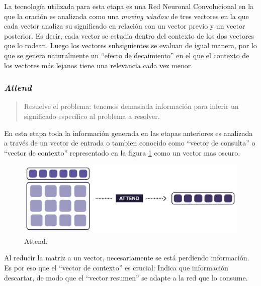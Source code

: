 \documentclass[12pt,a4paper,]{scrartcl}
\begin{document}
La tecnología utilizada para esta etapa es una Red Neuronal Convolucional en la que la oración es analizada como una \emph{moving window} de tres vectores en la que cada vector analiza su significado en relación con un vector previo y un vector posterior. Es decir, cada vector se estudia dentro del contexto de los dos vectores que lo rodean. Luego los vectores subsiguientes se evaluan de igual manera, por lo que se genera naturalmente un \enquote{efecto de decaimiento} en el que el contexto de los vectores más lejanos tiene una relevancia cada vez menor.

\hypertarget{attend}{%
\subsubsection{\texorpdfstring{\emph{Attend}}{Attend}}\label{attend}}

\begin{quote}
Resuelve el problema: tenemos demasiada información para inferir un significado específico al problema a resolver.
\end{quote}

En esta etapa toda la información generada en las etapas anteriores es analizada a través de un vector de entrada o tambien conocido como \enquote{vector de consulta} o \enquote{vector de contexto} representado en la figura \ref{fig:formula-attend} como un vector mas oscuro.

\begin{figure}[H]

{\centering \includegraphics{assets/deep-learning-formula-nlp_attend.pdf} 

}

\caption{Attend.}\label{fig:formula-attend}
\end{figure}

Al reducir la matriz a un vector, necesariamente se está perdiendo información. Es por eso que el \enquote{vector de contexto} es crucial: Indica que información descartar, de modo que el \enquote{vector resumen} se adapte a la red que lo consume.
\end{document}
